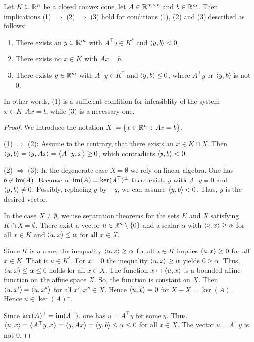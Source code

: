 \begin{theorem}[Farkas-lemma for the system $x \in K, A x =b$]
	\label{thm:farkas:kegel}
	Let $K \subseteq \mathbb{R}^n$ be a closed convex cone, let $A \in \mathbb{R}^{m \times n}$ and $b \in \mathbb{R}^m$. Then implications (1) $\Rightarrow$ (2) $\Rightarrow$ (3) hold for conditions (1), (2) and (3) described as follows: 
	\begin{enumerate}[(1)]
		\item There exists an $y \in \mathbb{R}^m$ with $A^\top y \in K^\ast$ and $\left\langle y , b \right\rangle < 0$.
		\item There exists no $x \in K$ with $A x = b$.
		\item There exists $y \in \mathbb{R}^m$ with $A^\top y \in K^\ast$ and $\left\langle y , b \right\rangle \le 0$, where $A^\top y$ or $\left\langle y , b \right\rangle$ is not $0$.
	\end{enumerate}
	In other words, (1) is a sufficient condition for infeasiblity of the system $x \in K, A x = b$, while (3) is a necessary one.
\end{theorem}
\begin{proof}
	We introduce the notation $X := \left\{ x \in \mathbb{R}^n \,:\, A x = b \right\}$. 
	
	(1) $\Rightarrow$ (2): Assume to the contrary, that there exists an $x \in K \cap X$. Then $\left\langle y , b  \right\rangle = \left\langle y  , A x \right\rangle = \left\langle A^\top y , x \right\rangle \ge 0$, which contradicts $\left\langle y , b \right\rangle < 0$.
	
	(2) $\Rightarrow$ (3): In the degenerate case $X = \emptyset$ we rely on linear algebra. One has $b \not \in \operatorname{im}(A)$. Because of $\operatorname{im}(A)= \ker(A^\top)^\perp$ there exists $y$ with $A^\top y = 0$ and $\left\langle y , b \right\rangle \ne 0$. Possibly, replacing $y$ by $-y$, we can assume  $\left\langle y , b \right\rangle < 0$. Thus, $y$ is the desired vector. 
	
	In the case $X \ne \emptyset$, we use separation theorems for the sets $K$ and $X$ satisfying $K \cap X = \emptyset$. There exist a vector $u \in \mathbb{R}^n \setminus \{0\}$ and a scalar $\alpha$ with $\left\langle u , x \right\rangle \ge \alpha$ for all $x \in K$ and $\left\langle u , x \right\rangle \le \alpha$ for all $x \in X$. 
	
	Since $K$ is a cone, the inequality $\left\langle u , x \right\rangle \ge \alpha $ for all $x \in K$ implies $\left\langle u , x \right\rangle \ge 0$ for all $x \in K$. That is $u \in K^\ast$. For $x=0$ the inequality $\left\langle u , x \right\rangle  \ge \alpha$ yields $0 \ge \alpha$. Thus, $\left\langle u , x \right\rangle \le \alpha \le 0$ holds for all $x \in X$. The function $x \mapsto \left\langle u , x \right\rangle$ is a bounded affine function on the affine space $X$. So, the function is constant on $X$. Then $\left\langle u , x' \right\rangle = \left\langle u , x'' \right\rangle$ for all $x', x'' \in X$. Hence $\left\langle u , x \right\rangle =0$ for $X - X = \ker(A)$. Hence $u \in \ker(A)^\perp.$ 
	
	Since $\ker(A)^\perp = \operatorname{im}(A^\top)$, one has $u = A^\top y$ for some $y$. Thus, $\left\langle u , x \right\rangle = \left\langle A^\top y , x \right\rangle = \left\langle y , A x \right\rangle = \left\langle y , b \right\rangle \le \alpha \le 0$ for all $x \in X$. The vector $u=A^\top y$ is not  $0$.
\end{proof}



